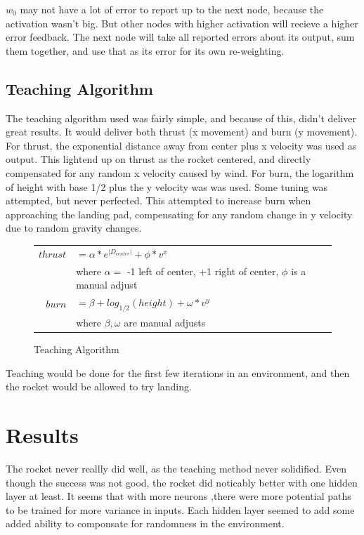 \documentclass[12pt]{article}
\begin{document}
$w_0$ may not have a lot of error to report up to the next node, because the activation wasn't big. But other
nodes with higher activation will recieve a higher error feedback. The next node will take all reported errors about its output, sum them together, and use that as its error for its own re-weighting.

\subsection{Teaching Algorithm}
\label{sec:teaching}
The teaching algorithm used was fairly simple, and because of this, didn't deliver great results. It would 
deliver both thrust (x movement) and burn (y movement). For thrust, the exponential distance away from
center plus x velocity was used as output. This lightend up on thrust as the rocket centered, and directly 
compensated for any random x velocity caused by wind. For burn, the logarithm of height with base 1/2 plus
the  y velocity was was used. Some tuning was attempted, but never perfected. This attempted to increase
burn when approaching the landing pad, compensating for any random change in y velocity due to random
gravity changes.

\begin{figure}[h]
        \begin{center}
		\begin{tabular}{r l}
			$thrust$		&	$ =  \alpha * e^{{|D_{center}|}} + \phi * v^x $	\\
						&	where $ \alpha =$  -1 left of center, +1 right of center, $\phi$ is a manual adjust \\
			$burn$		&	$ = \beta + log_{1/2}(height) + \omega * v^y $		\\
						&	where  $ \beta,\omega $ are manual adjusts

		\end{tabular}
                	\caption{Teaching Algorithm}
                	\label{teaching_alg}
        \end{center}
\end{figure}

Teaching would be done for the first few iterations in an environment, and then the rocket would be allowed
to try landing. 


\section{Results}
The rocket never reallly did well, as the teaching method never solidified. Even though the success was not
good, the rocket did noticably better with one hidden layer at least. It seems that with more neurons ,there 
were more potential paths to be trained for more variance in inputs. Each hidden layer seemed to add some 
added ability to componsate for randomness in the environment.
\end{document}
